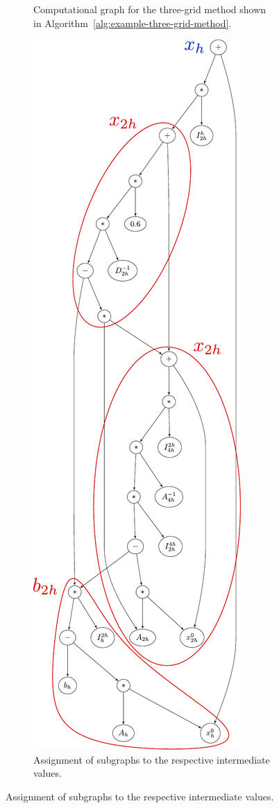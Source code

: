 \begin{figure}
\begin{subfigure}{0.49\textwidth}
		\caption{Computational graph for the three-grid method shown in Algorithm~\ref{alg:example-three-grid-method}.}
		\label{fig:example-three-grid-method-computational-graph}
	\end{subfigure}
	\centering
	\begin{subfigure}{0.49\textwidth}
		\includegraphics[scale=0.5]{figures/trees/three_grid_method_computational_graph_annotated.pdf}
		\caption{Assignment of subgraphs to the respective intermediate values.}
		\label{fig:example-three-grid-method-computational-graph-annotated}
	\end{subfigure}
\end{figure}
